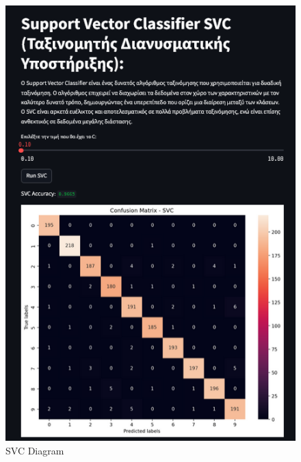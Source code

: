 \documentclass[unnumsec,webpdf,contemporary,large]{oup-authoring-template}%
\theoremstyle{thmstyleone}%
\theoremstyle{thmstyletwo}%
\theoremstyle{thmstylethree}%
\begin{document}
\begin{figure}
    \centering
    \includegraphics[width=1\linewidth]{svc.png}
    \caption{SVC Diagram}
    \label{fig:svc}
\end{figure}
\end{document}
